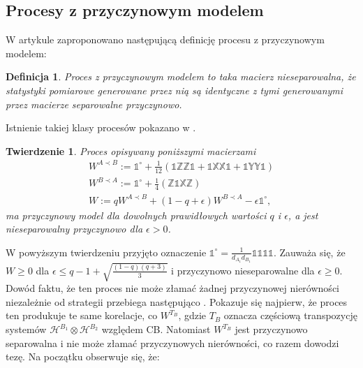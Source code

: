 \documentclass[10pt]{article} %
\newtheorem{definicja}{Definicja}
\newtheorem{tw}{Twierdzenie}
\newcommand{\Hx}[1]{\mathcal{H}^{#1}}
\newcommand{\X}{\mathbb{X}}
\newcommand{\Y}{\mathbb{Y}}
\newcommand{\Z}{\mathbb{Z}}
\newcommand{\I}{\mathbb{1}}
\newcommand{\IO}{\mathbb{1}^\circ}
\begin{document}
\subsection{Procesy z przyczynowym modelem}
W artykule \cite{causal_model} zaproponowano następującą definicję procesu z przyczynowym modelem:
\begin{definicja}
Proces z przyczynowym modelem to taka macierz nieseparowalna, że statystyki pomiarowe generowane przez nią są identyczne z tymi generowanymi przez macierze separowalne przyczynowo.
\end{definicja}
Istnienie takiej klasy procesów pokazano w \cite{causal_model}. 
\begin{tw}
Proces opisywany poniższymi macierzami
\begin{gather}
W^{A \prec B} := \IO + \frac{1}{12}(\I\Z\Z\I + \I\X\X\I + \I\Y\Y\I) \\
W^{B \prec A} := \IO + \frac{1}{4}(\Z\I\X\Z)\\
\label{eq:nsep_causal}
W := qW^{A \prec B} + (1-q+\epsilon)W^{B \prec A} -\epsilon\IO,
\end{gather}
ma przyczynowy model dla dowolnych prawidłowych wartości $q$ i $\epsilon$, a jest nieseparowalny przyczynowo dla $\epsilon > 0$.
\end{tw}
W powyższym twierdzeniu przyjęto oznaczenie $\IO = \frac{1}{d_{A_1}d_{B_1}} \I\I\I\I$.
Zauważa się, że $W \geq 0$ dla $\epsilon \leq q- 1 + \sqrt{\frac{(1-q)(q+3)}{3}}$ i przyczynowo nieseparowalne dla $\epsilon \geq 0$. 
Dowód faktu, że ten proces nie może złamać żadnej przyczynowej nierówności niezależnie od strategii przebiega następująco \cite{causal_model}.
Pokazuje się najpierw, że proces ten produkuje te same korelacje, co $W^{T_B}$, gdzie $T_B$ oznacza częściową transpozycję systemów $\Hx{B_1} \otimes \Hx{B_2}$ względem CB. Natomiast $W^{T_B}$ jest przyczynowo separowalna i nie może złamać przyczynowych nierówności, co razem dowodzi tezę. Na początku obserwuje się, że:
\end{document}
